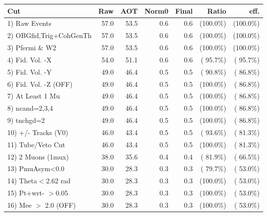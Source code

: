  \begin{table}[h!]\centering
 \begin{tabular}{||l||r|r|r|r|r|r||}
 \hline
 \hline
 Cut & Raw & AOT & Norm0 & Final & Ratio & eff.       \\
 \hline
  1) Raw Events           &         57.0 &         53.5 &          0.6 &          0.6 & (100.0\%) & (100.0\%) \\
  2) OBGfid,Trig+CohGenTh &         57.0 &         53.5 &          0.6 &          0.6 & (100.0\%) & (100.0\%) \\
  3) Pfermi \& W2         &         57.0 &         53.5 &          0.6 &          0.6 & (100.0\%) & (100.0\%) \\
  4) Fid. Vol. -X         &         54.0 &         51.1 &          0.6 &          0.6 & ( 95.7\%) & ( 95.7\%) \\
  5) Fid. Vol. -Y         &         49.0 &         46.4 &          0.5 &          0.5 & ( 90.8\%) & ( 86.8\%) \\
  6) Fid. Vol. -Z (OFF)   &         49.0 &         46.4 &          0.5 &          0.5 & (100.0\%) & ( 86.8\%) \\
  7) At Least 1 Mu        &         49.0 &         46.4 &          0.5 &          0.5 & (100.0\%) & ( 86.8\%) \\
  8) ncand=2,3,4          &         49.0 &         46.4 &          0.5 &          0.5 & (100.0\%) & ( 86.8\%) \\
  9) tnchgd=2             &         49.0 &         46.4 &          0.5 &          0.5 & (100.0\%) & ( 86.8\%) \\
 10) +/- Tracks (V0)      &         46.0 &         43.4 &          0.5 &          0.5 & ( 93.6\%) & ( 81.3\%) \\
 11) Tube/Veto Cut        &         46.0 &         43.4 &          0.5 &          0.5 & (100.0\%) & ( 81.3\%) \\
 12) 2 Muons (1mux)       &         38.0 &         35.6 &          0.4 &          0.4 & ( 81.9\%) & ( 66.5\%) \\
 13) PmuAsym<0.0          &         30.0 &         28.3 &          0.3 &          0.3 & ( 79.7\%) & ( 53.0\%) \\
 14) Theta$<$2.62 rad     &         30.0 &         28.3 &          0.3 &          0.3 & (100.0\%) & ( 53.0\%) \\
 15) Pt+wrt- $>$0.05      &         30.0 &         28.3 &          0.3 &          0.3 & (100.0\%) & ( 53.0\%) \\
 16) Mee $>$ 2.0  (OFF)   &         30.0 &         28.3 &          0.3 &          0.3 & (100.0\%) & ( 53.0\%) \\

\end{tabular}
\end{table}
